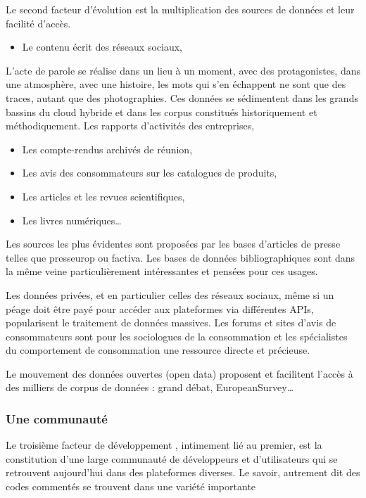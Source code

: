 \documentclass[
  letterpaper,
  DIV=11,
  numbers=noendperiod]{scrreprt}
\providecommand{\tightlist}{%
  \setlength{\itemsep}{0pt}\setlength{\parskip}{0pt}}\usepackage{longtable,booktabs,array}
\begin{document}
Le second facteur d'évolution est la multiplication des sources de
données et leur facilité d'accès.

\begin{itemize}
\tightlist
\item
  Le contenu écrit des réseaux sociaux,
\end{itemize}

L'acte de parole se réalise dans un lieu à un moment, avec des
protagonistes, dans une atmosphère, avec une histoire, les mots qui s'en
échappent ne sont que des traces, autant que des photographies. Ces
données se sédimentent dans les grands bassins du cloud hybride et dans
les corpus constitués historiquement et méthodiquement. Les rapports
d'activités des entreprises,

\begin{itemize}
\item
  Les compte-rendus archivés de réunion,
\item
  Les avis des consommateurs sur les catalogues de produits,
\item
  Les articles et les revues scientifiques,
\item
  Les livres numériques\ldots{}
\end{itemize}

Les sources les plus évidentes sont proposées par les bases d'articles
de presse telles que presseurop ou factiva. Les bases de données
bibliographiques sont dans la même veine particulièrement intéressantes
et pensées pour ces usages.

Les données privées, et en particulier celles des réseaux sociaux, même
si un péage doit être payé pour accéder aux plateformes via différentes
APIs, popularisent le traitement de données massives. Les forums et
sites d'avis de consommateurs sont pour les sociologues de la
consommation et les spécialistes du comportement de consommation une
ressource directe et précieuse.

Le mouvement des données ouvertes (open data) proposent et facilitent
l'accès à des milliers de corpus de données : grand débat,
EuropeanSurvey\ldots{}

\subsubsection{Une communauté}\label{une-communautuxe9}

Le troisième facteur de développement , intimement lié au premier, est
la constitution d'une large communauté de développeurs et d'utilisateurs
qui se retrouvent aujourd'hui dans des plateformes diverses. Le savoir,
autrement dit des codes commentés se trouvent dans une variété
importante
\end{document}
